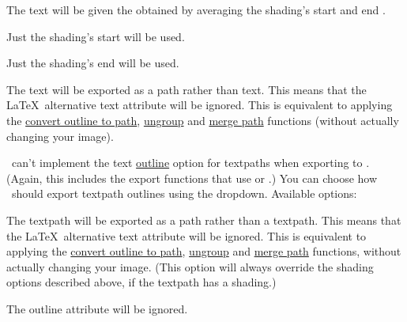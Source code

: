 \begin{deflist}
\itemtitle
 {}

\begin{itemdesc}
The text will be given the  obtained by averaging the
shading's start and end .
\end{itemdesc}

\itemtitle
 {}

\begin{itemdesc}
Just the shading's start  will be used.
\end{itemdesc}

\itemtitle
 {}

\begin{itemdesc}
Just the shading's end  will be used.
\end{itemdesc}

\itemtitle
 {}

\begin{itemdesc}
The text will be exported as a path rather than text. This means
that the \LaTeX\ alternative text attribute will be ignored. This is
equivalent to applying the 
\hyperref[sec:outlinetopath]{convert outline to path}, 
\hyperref[sec:grouping]{ungroup} and 
\hyperref[sec:mergepaths]{merge path}
functions (without actually changing your image).
\end{itemdesc}

\end{deflist}


\FlowframTk\ can't implement the text
\hyperref[sec:textoutline]{outline} option for
\glspl{textpath} when exporting to . (Again, this
includes the export functions that use  or .)
You can choose how \FlowframTk\ should export \gls{textpath}
outlines using the 
\gls*{dropdown}. Available options:

\begin{deflist}
\itemtitle
 {}

\begin{itemdesc}
The \gls{textpath} will be exported as a path rather than a
\gls{textpath}. This means that the \LaTeX\
alternative text attribute will be ignored. This is equivalent to
applying the
\hyperref[sec:outlinetopath]{convert outline to path}, 
\hyperref[sec:grouping]{ungroup} and 
\hyperref[sec:mergepaths]{merge path}
functions, without actually changing your image.
(This option will always override the shading options described
above, if the \gls{textpath} has a shading.)
\end{itemdesc}

\itemtitle
 {}

\begin{itemdesc}
The outline attribute will be ignored.
\end{itemdesc}

\end{deflist}

